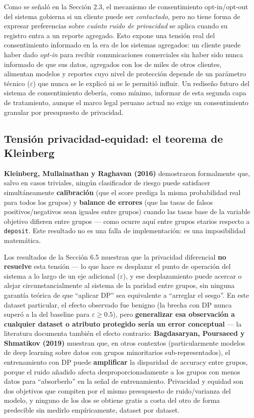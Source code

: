 \documentclass[11pt,a4paper]{article}
\newcommand{\eps}{\ensuremath{\varepsilon}}
\begin{document}
Como se señaló en la Sección 2.3, el mecanismo de consentimiento opt-in/opt-out del sistema
gobierna si un cliente puede ser \emph{contactado}, pero no tiene forma de expresar preferencias
sobre \emph{cuánto ruido de privacidad} se aplica cuando su registro entra a un reporte agregado.
Esto expone una tensión real del consentimiento informado en la era de los sistemas agregados: un
cliente puede haber dado \emph{opt-in} para recibir comunicaciones comerciales sin haber sido
nunca informado de que sus datos, agregados con los de miles de otros clientes, alimentan modelos
y reportes cuyo nivel de protección depende de un parámetro técnico ($\eps$) que nunca se le
explicó ni se le permitió influir. Un rediseño futuro del sistema de consentimiento debería, como
mínimo, informar de esta segunda capa de tratamiento, aunque el marco legal peruano actual no
exige un consentimiento granular por presupuesto de privacidad.

\subsection{Tensión privacidad-equidad: el teorema de Kleinberg}

\textbf{Kleinberg, Mullainathan y Raghavan (2016)} demostraron formalmente que, salvo en casos
triviales, ningún clasificador de riesgo puede satisfacer simultáneamente \textbf{calibración}
(que el score prediga la misma probabilidad real para todos los grupos) y \textbf{balance de
errores} (que las tasas de falsos positivos/negativos sean iguales entre grupos) cuando las tasas
base de la variable objetivo difieren entre grupos --- como ocurre aquí entre grupos etarios
respecto a \texttt{deposit}. Este resultado no es una falla de implementación: es una
imposibilidad matemática.

Los resultados de la Sección 6.5 muestran que la privacidad diferencial \textbf{no resuelve} esta
tensión --- lo que hace es desplazar el punto de operación del sistema a lo largo de un eje
adicional ($\eps$), y ese desplazamiento puede acercar o alejar circunstancialmente al sistema de
la paridad entre grupos, sin ninguna garantía teórica de que ``aplicar DP'' sea equivalente a
``arreglar el sesgo''. En este dataset particular, el efecto observado fue benigno (la brecha con
DP nunca superó a la del baseline para $\eps\geq0.5$), pero \textbf{generalizar esa observación a
cualquier dataset o atributo protegido sería un error conceptual} --- la literatura documenta
también el efecto contrario: \textbf{Bagdasaryan, Poursaeed y Shmatikov (2019)} muestran que, en
otros contextos (particularmente modelos de deep learning sobre datos con grupos minoritarios
sub-representados), el entrenamiento con DP puede \textbf{amplificar} la disparidad de accuracy
entre grupos, porque el ruido añadido afecta desproporcionadamente a los grupos con menos datos
para ``absorberlo'' en la señal de entrenamiento. Privacidad y equidad son dos objetivos que
compiten por el mismo presupuesto de ruido/varianza del modelo, y ninguno de los dos se obtiene
gratis a costa del otro de forma predecible sin medirlo empíricamente, dataset por dataset.
\end{document}
